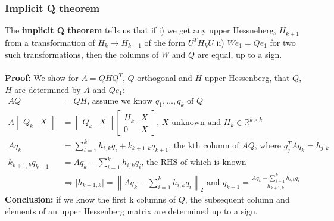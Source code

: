 \documentclass{article}
\newcommand{\norm}[2]{\left\lVert#1\right\rVert_#2}
\newcommand{\abs}[1]{\lvert#1\rvert}
\begin{document}
\subsubsection{Implicit Q theorem}
The \textbf{implicit Q theorem} tells us that if i) we get any upper Hessneberg, $H_{k+1}$ from a transformation of $H_k \rightarrow H_{k+1}$ of the form $U^TH_kU$ ii) $We_1 = Qe_1$ for two such transformations, then the columns of $W$ and $Q$ are equal, up to a sign.\\ \\
\textbf{Proof:} We show for $A = QHQ^T$, $Q$ orthogonal and $H$ upper Hessenberg, that $Q$, $H$ are determined by $A$ and $Qe_1$:
\begin{align*}
    AQ & = QH \textrm{, assume we know } q_1, \dots, q_k \textrm{ of } Q \\
    A \begin{bmatrix} Q_k & X \end{bmatrix} &= 
        \begin{bmatrix} Q_k & X \end{bmatrix} 
        \begin{bmatrix} H_k & X \\ 0 & X \end{bmatrix} \textrm{, $X$ unknown and } H_k \in \mathbb{R}^{k \times k}\\
    Aq_k &= \sum_{i=1}^kh_{i,k}q_i + k_{k+1,k}q_{k+1} \textrm{, the kth column of $AQ$, where } q_j^TAq_k = h_{j,k}\\
    k_{k+1,k}q_{k+1} &= Aq_k - \sum_{i=1}^kh_{i,k}q_i \textrm{, the RHS of which is known}\\
    &\Rightarrow \abs{h_{k+1,k}} = \norm{Aq_k - \sum_{i=1}^kh_{i,k}q_i}{2} \textrm{ and } q_{k+1} = \frac{Aq_k - \sum_{i=1}^kh_{i,k}q_i}{h_{k+1,k}}
\end{align*}
\textbf{Conclusion:} if we know the first k columns of $Q$, the subsequent column and elements of an upper Hessenberg matrix are determined up to a sign.
\end{document}
